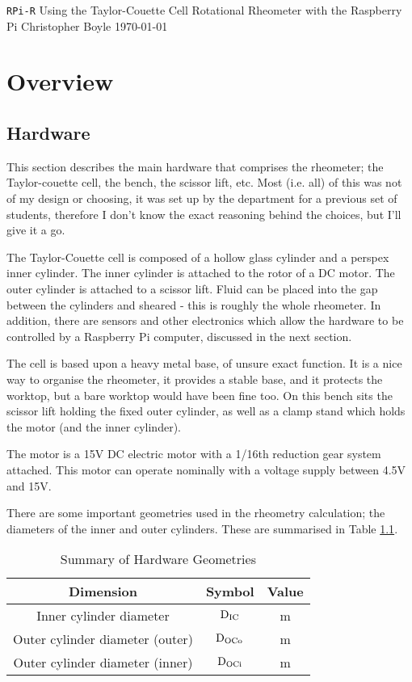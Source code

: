 \documentclass{report}
\begin{document}
	
	{
		\centering
		\Huge \noindent
		\texttt{RPi-R}
		\vskip2cm
		\normalsize Using the Taylor-Couette Cell Rotational Rheometer with the Raspberry Pi
		\vfill
		\small Christopher Boyle \hfill \today
		\newpage
	}
	
	\tableofcontents
	
	\chapter{Overview}
	
		\section{Hardware}
			This section describes the main hardware that comprises the rheometer; the Taylor-couette cell, the bench, the scissor lift, etc. Most (i.e. all) of this was not of my design or choosing, it was set up by the department for a previous set of students, therefore I don't know the exact reasoning behind the choices, but I'll give it a go.
			
			The Taylor-Couette cell is composed of a hollow glass cylinder and a perspex inner cylinder. The inner cylinder is attached to the rotor of a DC motor. The outer cylinder is attached to a scissor lift. Fluid can be placed into the gap between the cylinders and sheared - this is roughly the whole rheometer. In addition, there are sensors and other electronics which allow the hardware to be controlled by a Raspberry Pi computer, discussed in the next section.
			
			The cell is based upon a heavy metal base, of unsure exact function. It is a nice way to organise the rheometer, it provides a stable base, and it protects the worktop, but a bare worktop would have been fine too. On this bench sits the scissor lift holding the fixed outer cylinder, as well as a clamp stand which holds the motor (and the inner cylinder).
			
			The motor is a 15V DC electric motor with a 1/16th reduction gear system attached. This motor can operate nominally with a voltage supply between 4.5V and 15V.
			
			There are some important geometries used in the rheometry calculation; the diameters of the inner and outer cylinders. These are summarised in Table \ref{tablegeoms}.
			
			\begin{table}
				\centering
				\caption{Summary of Hardware Geometries}
				\label{tablegeoms}
				\begin{tabular}{| c | c | c |}
					\hline
					\textbf{Dimension} & \textbf{Symbol} & \textbf{Value} \\ \hline
					Inner cylinder diameter & $\rm D_{IC}$ & m \\ \hline
					Outer cylinder diameter (outer) & $\rm D_{OCo}$ & m \\ \hline
					Outer cylinder diameter (inner) & $\rm D_{OCi}$ & m \\ \hline
				\end{tabular}
			\end{table}
			
\end{document}

